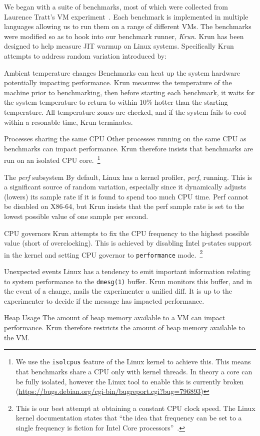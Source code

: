 \documentclass[10pt,preprint]{sigplanconf}
\begin{document}
We began with a suite of benchmarks, most of which were collected from Laurence
Tratt's VM experiment~\cite{XXX}. Each benchmark is implemented in multiple
languages allowing us to run them on a range of different VMs. The benchmarks
were modified so as to hook into our benchmark runner, \emph{Krun}. Krun has
been designed to
help measure JIT warmup on Linux systems. Specifically Krun attempts to address
random variation introduced by:
%
\begin{description*}
\item[Ambient temperature changes] Benchmarks can heat up the system hardware
potentially impacting performance. Krun measures the temperature of the machine
prior to benchmarking, then before starting each benchmark, it waits for the
system temperature to return to within 10$\%$ hotter than the starting
temperature. All temperature zones are checked, and if the system fails to cool
within a resonable time, Krun terminates.
\item[Processes sharing the same CPU] Other processes running on the same CPU
as benchmarks can impact performance. Krun therefore insists that benchmarks
are run on an isolated CPU core.~\footnote{We use the \texttt{isolcpus} feature
of the Linux kernel to achieve this. This means that benchmarks share a CPU
only with kernel threads. In theory a core can be fully isolated, however the
Linux tool to enable this is currently broken
(\url{https://bugs.debian.org/cgi-bin/bugreport.cgi?bug=796893})}
\item[The \emph{perf} subsystem] By default, Linux has a kernel profiler,
\emph{perf}, running. This is a significant source of random variation,
especially since it dynamically adjusts (lowers) its sample rate if it is found
to spend too much CPU time. Perf cannot be disabled on X86-64, but Krun insists
that the perf sample rate is set to the lowest possible value of one sample per
second.
\item[CPU governors] Krun attempts to fix the CPU frequency to the highest
possible value (short of overclocking). This is achieved by disabling Intel
p-states support in the kernel and setting CPU governor to \texttt{performance}
mode.~\footnote{This is our best attempt at obtaining a constant CPU clock
speed. The Linux kernel documentation states that ``the idea that frequency can
be set to a single frequency is fiction for Intel Core
processors''~\cite{XXX}.}
\item[Unexpected events] Linux has a tendency to emit important information
relating to system performance to the \texttt{dmesg(1)} buffer. Krun monitors
this buffer, and in the event of a change, mails the experimenter a unified
diff. It is up to the experimenter to decide if the message has impacted
performance.
\item[Heap Usage] The amount of heap memory available to a VM can impact
performance. Krun therefore restricts the amount of heap memory available to
the VM.
\end{description*}
\end{document}
